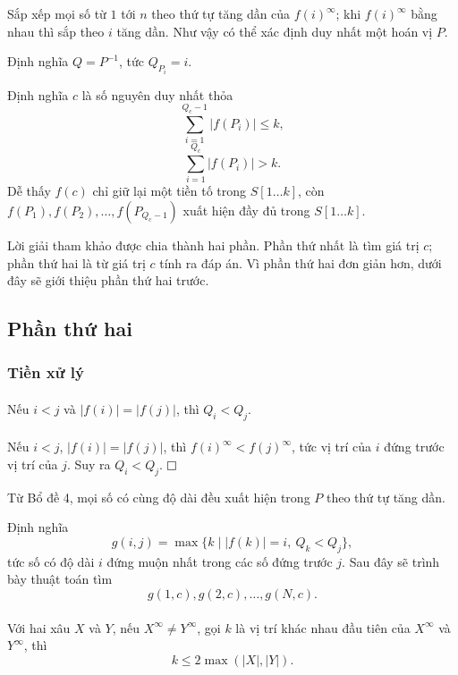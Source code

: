 \documentclass[11pt]{article}
\newcommand{\proofbox}{\ensuremath{\vcenter{\hrule height 0.45pt
  \hbox{\vrule width 0.45pt height 6pt\kern 6pt\vrule width 0.45pt}
  \hrule height 0.45pt}}}
\begin{document}
Sắp xếp mọi số từ \(1\) tới \(n\) theo thứ tự tăng dần của \(f(i)^\infty\);
khi \(f(i)^\infty\) bằng nhau thì sắp theo \(i\) tăng dần. Như vậy có thể xác
định duy nhất một hoán vị \(P\).

Định nghĩa \(Q=P^{-1}\), tức \(Q_{P_i}=i\).

Định nghĩa \(c\) là số nguyên duy nhất thỏa
\[
\sum_{i=1}^{Q_c-1}|f(P_i)|\le k,
\]
\[
\sum_{i=1}^{Q_c}|f(P_i)|>k.
\]
Dễ thấy \(f(c)\) chỉ giữ lại một tiền tố trong \(S[1\ldots k]\), còn
\(f(P_1),f(P_2),\ldots,f(P_{Q_c-1})\) xuất hiện đầy đủ trong \(S[1\ldots k]\).

Lời giải tham khảo được chia thành hai phần. Phần thứ nhất là tìm giá trị
\(c\); phần thứ hai là từ giá trị \(c\) tính ra đáp án. Vì phần thứ hai đơn
giản hơn, dưới đây sẽ giới thiệu phần thứ hai trước.

\subsection{Phần thứ hai}

\subsubsection{Tiền xử lý}

\paragraph{}
Nếu \(i<j\) và \(|f(i)|=|f(j)|\), thì \(Q_i<Q_j\).

\paragraph{}
Nếu \(i<j\), \(|f(i)|=|f(j)|\), thì \(f(i)^\infty<f(j)^\infty\), tức vị trí
của \(i\) đứng trước vị trí của \(j\). Suy ra \(Q_i<Q_j\). \proofbox

Từ Bổ đề 4, mọi số có cùng độ dài đều xuất hiện trong \(P\) theo thứ tự tăng
dần.

Định nghĩa
\[
g(i,j)=\max\{k\mid |f(k)|=i,\ Q_k<Q_j\},
\]
tức số có độ dài \(i\) đứng muộn nhất trong các số đứng trước \(j\). Sau đây
sẽ trình bày thuật toán tìm
\[
g(1,c),g(2,c),\ldots,g(N,c).
\]

\paragraph{}
Với hai xâu \(X\) và \(Y\), nếu \(X^\infty\ne Y^\infty\), gọi \(k\) là vị trí
khác nhau đầu tiên của \(X^\infty\) và \(Y^\infty\), thì
\[
k\le 2\max(|X|,|Y|).
\]
\end{document}
